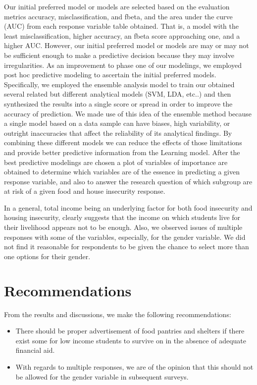 \documentclass[
  10pt,
]{article}
\begin{document}
Our initial preferred model or models are selected based on the evaluation metrics accuracy, misclassification, and fbeta, and the area under the curve (AUC) from each response variable table obtained. That is, a model with the least misclassification, higher accuracy, an fbeta score approaching one, and a higher AUC. However, our initial preferred model or models are may or may not be sufficient enough to make a predictive decision because they may involve irregularities. As an improvement to phase one of our modelings, we employed post hoc predictive modeling to ascertain the initial preferred models. Specifically, we employed the ensemble analysis model to train our obtained several related but different analytical models (SVM, LDA, etc..) and then synthesized the results into a single score or spread in order to improve the accuracy of prediction. We made use of this idea of the ensemble method because a single model based on a data sample can have biases, high variability, or outright inaccuracies that affect the reliability of its analytical findings. By combining these different models we can reduce the effects of those limitations and provide better predictive information from the Learning model. After the best predictive modelings are chosen a plot of variables of importance are obtained to determine which variables are of the essence in predicting a given response variable, and also to answer the research question of which subgroup are at risk of a given food and house insecurity response.

In a general, total income being an underlying factor for both food insecurity and housing insecurity, clearly suggests that the income on which students live for their livelihood appears not to be enough. Also, we observed issues of multiple responses with some of the variables, especially, for the gender variable. We did not find it reasonable for respondents to be given the chance to select more than one options for their gender.

\hypertarget{recommendations}{%
\section{Recommendations}\label{recommendations}}

From the results and discussions, we make the following recommendations:

\begin{itemize}
\item
  There should be proper advertisement of food pantries and shelters if there exist some for low income students to survive on in the absence of adequate financial aid.
\item
  With regards to multiple responses, we are of the opinion that this should not be allowed for the gender variable in subsequent surveys.
\end{itemize}
\end{document}
